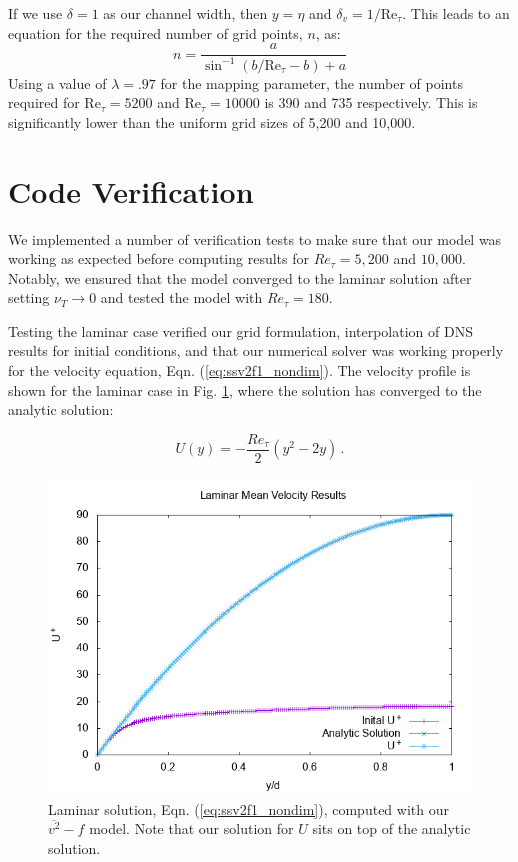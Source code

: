 \documentclass[a4paper,11pt]{article}
\begin{document}
If we use $\delta = 1$ as our channel width, then $y = \eta$ and $\delta_v = 1/\mathrm{Re}_{\tau}$.  This leads to an equation for the required number of grid points, $n$, as:
\begin{equation}
 n = \frac{a}{\sin^{-1}(b/\mathrm{Re}_{\tau}-b)+a}
\end{equation}
Using a value of $\lambda = .97$ for the mapping parameter, the number of points required for $\mathrm{Re}_{\tau}=5200$ and $\mathrm{Re}_{\tau}=10000$ is 390 and 735 respectively. This is significantly lower than the uniform grid sizes of 5,200 and 10,000.


\section{Code Verification}

We implemented a number of verification tests to make sure that our model was
working as expected before computing results for $Re_\tau = 5,200$ and
$10,000$. Notably, we ensured that the model converged to the laminar solution
after setting $\nu_T \rightarrow 0$ and tested the model with $Re_\tau = 180$. 


Testing the laminar case verified our grid formulation, interpolation of DNS
results for initial conditions, and that our numerical solver was working
properly for the velocity equation, Eqn.
(\ref{eq:ssv2f1_nondim}). The velocity profile is shown for the laminar case in Fig.
\ref{fig:laminar}, where the solution has converged to the analytic
solution: 

\begin{equation*}
  U(y) = -\frac{Re_\tau}{2}\left(y^2 - 2y\right) \, .
\end{equation*}

\begin{figure}
 \centering
 \includegraphics[width=.7\textwidth]{laminar}
 \caption{Laminar solution, Eqn. (\ref{eq:ssv2f1_nondim}), computed with
our $\overline{v^2}-f$ model. Note that our solution for $U$ sits on top of the
analytic solution.}
 \label{fig:laminar}
\end{figure}
\end{document}
